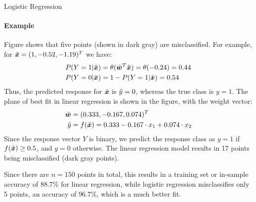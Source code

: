 \begin{frame}{Logistic Regression}
\framesubtitle{Example}

Figure 
    shows that five points (shown in dark gray) are misclassified. For
    example, for $\tilde{{\boldsymbol x}} = (1,-0.52,-1.19)^T$ we have:
        \begin{align*}
            P(Y=1|\tilde{{\boldsymbol x}}) & = \theta(\tilde{{\boldsymbol w}}^T\tilde{{\boldsymbol x}}) = \theta(-0.24) = 0.44\\
            P(Y=0|\tilde{{\boldsymbol x}}) & = 1 - P(Y=1|\tilde{{\boldsymbol x}}) = 0.54
        \end{align*}
    Thus, the predicted response for $\tilde{{\boldsymbol x}}$ is $\hat{y} = 0$, whereas the
    true class is $y=1$.
%
The plane of best fit in linear regression
    is shown in the figure,
with the weight
    vector:
    \begin{align*}
        \tilde{{\boldsymbol w}} & = (0.333, -0.167, 0.074)^T\\
        \hat{y} & = f(\tilde{{\boldsymbol x}}) = 0.333 - 0.167\cdot x_1 + 0.074 \cdot x_2
    \end{align*}
    Since the response vector $Y$ is binary, we predict the response
    class as $y=1$ if $f(\tilde{{\boldsymbol x}}) \ge 0.5$, and $y=0$ otherwise.
    The linear regression model results in 17 points being misclassified
    (dark gray points).%
    
    Since there are $n=150$ points in total, this results in a training
    set or in-sample accuracy of $88.7\%$ for linear regression,
 while logistic regression misclassifies only 5 points,
    an accuracy of $96.7\%$, which is a much better fit.%
\end{frame}
%
%
%
%

